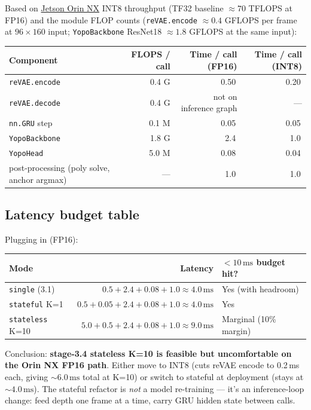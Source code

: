 \documentclass[11pt]{article}
\newcommand{\ms}{\,\text{ms}}
\begin{document}
Based on
\href{https://developer.nvidia.com/embedded/jetson-orin}{Jetson Orin NX} INT8
throughput (TF32 baseline $\approx 70$ TFLOPS at FP16) and the module FLOP
counts (\texttt{reVAE.encode} $\approx 0.4$ GFLOPS per frame at $96\times160$
input; \texttt{YopoBackbone} ResNet18 $\approx 1.8$ GFLOPS at the same input):
\begin{center}
\begin{tabular}{lrrr}
\hline
Component & FLOPS / call & Time / call (FP16) & Time / call (INT8) \\
\hline
\texttt{reVAE.encode}     & 0.4 G & 0.50\ms & 0.20\ms \\
\texttt{reVAE.decode}     & 0.4 G & not on inference graph & --- \\
\texttt{nn.GRU} step      & 0.1 M & 0.05\ms & 0.05\ms \\
\texttt{YopoBackbone}     & 1.8 G & 2.4\ms  & 1.0\ms \\
\texttt{YopoHead}         & 5.0 M & 0.08\ms & 0.04\ms \\
post-processing (poly solve, anchor argmax) & --- & 1.0\ms & 1.0\ms \\
\hline
\end{tabular}
\end{center}

\subsection{Latency budget table}

Plugging in (FP16):
\begin{center}
\begin{tabular}{lrl}
\hline
Mode                    & Latency & $<10\ms$ budget hit? \\
\hline
\texttt{single} (3.1)   & $0.5 + 2.4 + 0.08 + 1.0 \approx 4.0\ms$  & Yes (with headroom) \\
\texttt{stateful} K=1   & $0.5 + 0.05 + 2.4 + 0.08 + 1.0 \approx 4.0\ms$ & Yes \\
\texttt{stateless} K=10 & $5.0 + 0.5 + 2.4 + 0.08 + 1.0 \approx 9.0\ms$  & Marginal (10\% margin) \\
\hline
\end{tabular}
\end{center}

Conclusion: \textbf{stage-3.4 stateless K=10 is feasible but uncomfortable on
the Orin NX FP16 path}. Either move to INT8 (cuts reVAE encode to 0.2\,ms
each, giving $\sim 6.0\ms$ total at K=10) or switch to stateful at deployment
(stays at $\sim 4.0\ms$). The stateful refactor is \emph{not} a model
re-training --- it's an inference-loop change: feed depth one frame at a time,
carry GRU hidden state between calls.
\end{document}
